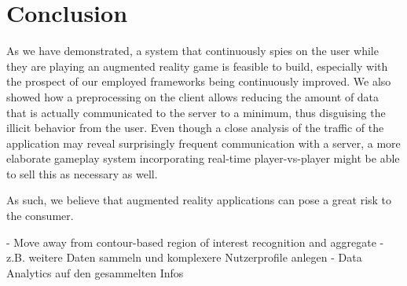 \section{Conclusion}
\label{sec:conclusion}

As we have demonstrated, a system that continuously spies on the user while they are playing an augmented reality game is feasible to build, especially with the prospect of our employed frameworks being continuously improved. We also showed how a preprocessing on the client allows reducing the amount of data that is actually communicated to the server to a minimum, thus disguising the illicit behavior from the user. Even though a close analysis of the traffic of the application may reveal surprisingly frequent communication with a server, a more elaborate gameplay system incorporating real-time player-vs-player might be able to sell this as necessary as well.

As such, we believe that augmented reality applications can pose a great risk to the consumer. %



- Move away from contour-based region of interest recognition and aggregate 
- z.B. weitere Daten sammeln und komplexere Nutzerprofile anlegen
- Data Analytics auf den gesammelten Infos
